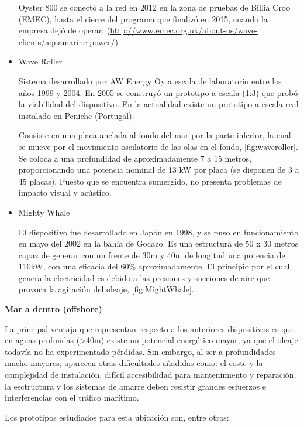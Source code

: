 \begin{itemize}
  Oyster 800 se conectó a la red en 2012 en la zona de pruebas de Billia
  Croo (EMEC), hasta el cierre del programa que finalizó en 2015, cuando
  la empresa dejó de operar.
  (\url{http://www.emec.org.uk/about-us/wave-clients/aquamarine-power/})


\item
  Wave Roller

  Sistema desarrollado por AW Energy Oy a escala de laboratorio entre
  los años 1999 y 2004. En 2005 se construyó un prototipo a escala (1:3)
  que probó la viabilidad del dispositivo. En la actualidad existe un
  prototipo a escala real instalado en Peniche (Portugal).

  Consiste en una placa anclada al fondo del mar por la parte inferior,
  la cual se mueve por el movimiento oscilatorio de las olas en el
  fondo, \autoref{fig:waveroller}. Se coloca a una profundidad de aproximadamente 7 a 15 metros,
  proporcionando una potencia nominal de 13 kW por placa (se disponen de
  3 a 45 placas). Puesto que se encuentra sumergido, no presenta
  problemas de impacto visual y acústico.



\item
  Mighty Whale

  El dispositivo fue desarrollado en Japón en 1998, y se puso en
  funcionamiento en mayo del 2002 en la bahía de Gocazo. Es una
  estructura de 50 x 30 metros capaz de generar con un frente de 30m y
  40m de longitud una potencia de 110kW, con una eficacia del 60\%
  aproximadamente. El principio por el cual genera la electricidad es
  debido a las presiones y succiones de aire que provoca la agitación
  del oleaje, \autoref{fig:MightWhale}.


\end{itemize}

\textbf{Mar a dentro (offshore)}

La principal ventaja que representan respecto a los anteriores
dispositivos es que en aguas profundas (\textgreater{}40m) existe un
potencial energético mayor, ya que el oleaje todavía no ha experimentado
pérdidas. Sin embargo, al ser a profundidades mucho mayores, aparecen
otras dificultades añadidas como: el coste y la complejidad de
instalación, difícil accesibilidad para mantenimiento y reparación, la
esctructura y los sistemas de amarre deben resistir grandes esfuerzos e
interferencias con el tráfico marítimo.

Los prototipos estudiados para esta ubicación son, entre otros:

